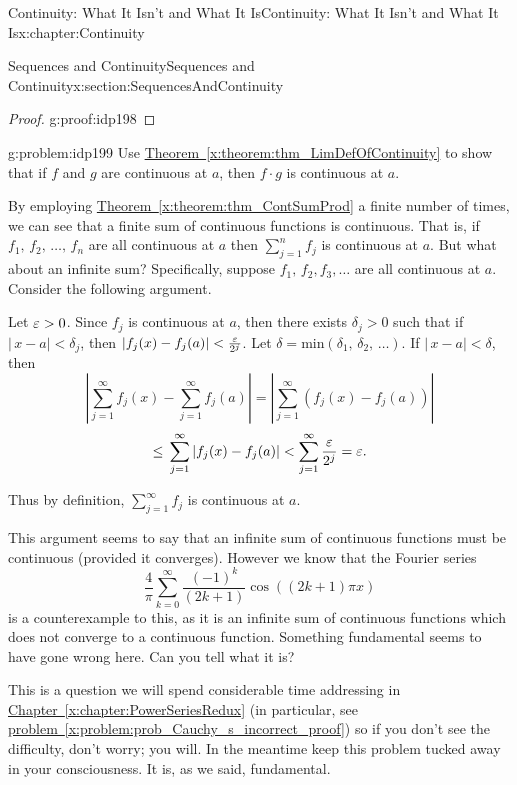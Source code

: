 \begin{chapterptx}{Continuity: What It Isn't and What It Is}{}{Continuity: What It Isn't and What It Is}{}{}{x:chapter:Continuity}
\begin{sectionptx}{Sequences and Continuity}{}{Sequences and Continuity}{}{}{x:section:SequencesAndContinuity}
\begin{proof}{}{g:proof:idp198}
		\end{proof}
		\begin{problem}{}{g:problem:idp199}%
			Use \hyperref[x:theorem:thm_LimDefOfContinuity]{Theorem~{\xreffont\ref{x:theorem:thm_LimDefOfContinuity}}} to show that if \(f\) and \(g\) are continuous at \(a\), then \(f\cdot g\) is continuous at \(a\).%
		\end{problem}
		By employing \hyperref[x:theorem:thm_ContSumProd]{Theorem~{\xreffont\ref{x:theorem:thm_ContSumProd}}} a finite number of times, we can see that a finite sum of continuous functions is continuous. That is, if \(f_1,\,f_2,\,\ldots,\,f_n\) are all continuous at \(a\) then \(\sum_{j=1}^nf_j\) is continuous at \(a\). But what about an infinite sum? Specifically, suppose \(f_1,\,f_2,f_3,\ldots\) are all continuous at \(a\). Consider the following argument.%
		\par
		Let \(\varepsilon>0\). Since \(f_j\) is continuous at \(a\), then there exists \(\delta_j>0\) such that if \(|\,x-a|\lt \delta_j\), then \(|f_j(x)-f_j(a)|< \frac{\varepsilon}{2^j}\). Let \(\delta=\)min\(\left(\delta_1,\,\delta_2,\,\ldots\right)\). If \(|\,x-a|\lt \delta\), then%
		\begin{equation*}
			\left|\sum_{j=1}^\infty f_j(x)-\sum_{j=1}^\infty f_j(a)\right|=\left|\sum_{j=1}^\infty\left(f_j(x)-f_j(a)\right)\right|
		\end{equation*}
		\begin{equation*}
			\leq\,\sum_{j=1}^\infty|f_j(x)-f_j(a)|< \sum_{j=1}^\infty\frac{ \varepsilon}{2^j}=\varepsilon\text{.}
		\end{equation*}
		\par
		Thus by definition, \(\sum_{j=1}^\infty f_j\) is continuous at \(a\).%
		\par
		This argument seems to say that an infinite sum of continuous functions must be continuous (provided it converges). However we know that the Fourier series%
		\begin{equation*}
			\frac{4}{\pi}\sum_{k=0}^\infty\frac{\left(-1\right)^k}{\left(2k+1\right)}\cos\left(\left(2k+1\right)\pi x\right)
		\end{equation*}
		is a counterexample to this, as it is an infinite sum of continuous functions which does not converge to a continuous function. Something fundamental seems to have gone wrong here. Can you tell what it is?%
		\par
		This is a question we will spend considerable time addressing in \hyperref[x:chapter:PowerSeriesRedux]{Chapter~{\xreffont\ref{x:chapter:PowerSeriesRedux}}} (in particular, see \hyperref[x:problem:prob_Cauchy_s_incorrect_proof]{problem~{\xreffont\ref{x:problem:prob_Cauchy_s_incorrect_proof}}}) so if you don't see the difficulty, don't worry; you will. In the meantime keep this problem tucked away in your consciousness. It is, as we said, fundamental.%

\end{sectionptx}
\end{chapterptx}
